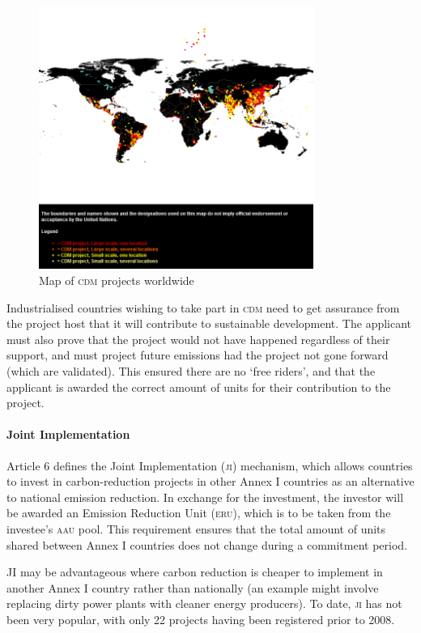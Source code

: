 \documentclass[]{article} %
\begin{document}
\begin{figure}[h!]
	\centering
	\includegraphics[width=0.8\textwidth]{img/CDM_Map.png}
	\caption{Map of \textsc{cdm} projects worldwide~\cite{UNFCCC-CDM-map}}
	\label{fig:cdm_map}
\end{figure}

Industrialised countries wishing to take part in \textsc{cdm} need to get assurance from the project host that it will contribute to sustainable development. The applicant must also prove that the project would not have happened regardless of their support, and must project future emissions had the project not gone forward (which are validated). This ensured there are no ‘free riders’, and that the applicant is awarded the correct amount of units for their contribution to the project.

\paragraph{Joint Implementation}

Article 6 defines the Joint Implementation (\textsc{ji}) mechanism, which allows countries to invest in carbon-reduction projects in other Annex I countries as an alternative to national emission reduction. In exchange for the investment, the investor will be awarded an Emission Reduction Unit (\textsc{eru}), which is to be taken from the investee’s \textsc{aau} pool. This requirement ensures that the total amount of units shared between Annex I countries does not change during a commitment period.

JI may be advantageous where carbon reduction is cheaper to implement in another Annex I country rather than nationally (an example might involve replacing dirty power plants with cleaner energy producers). To date, \textsc{ji} has not been very popular, with only 22 projects having been registered prior to 2008.
\end{document}
